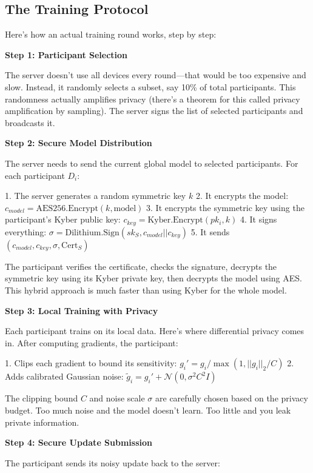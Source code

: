 \documentclass[journal]{IEEEtran}
\begin{document}
\subsection{The Training Protocol}

Here's how an actual training round works, step by step:

\textbf{Step 1: Participant Selection}

The server doesn't use all devices every round—that would be too expensive and slow. Instead, it randomly selects a subset, say 10\% of total participants. This randomness actually amplifies privacy (there's a theorem for this called privacy amplification by sampling). The server signs the list of selected participants and broadcasts it.

\textbf{Step 2: Secure Model Distribution}

The server needs to send the current global model to selected participants. For each participant $D_i$:

1. The server generates a random symmetric key $k$
2. It encrypts the model: $c_{model} = \text{AES256.Encrypt}(k, \text{model})$  
3. It encrypts the symmetric key using the participant's Kyber public key: $c_{key} = \text{Kyber.Encrypt}(pk_i, k)$
4. It signs everything: $\sigma = \text{Dilithium.Sign}(sk_S, c_{model} || c_{key})$
5. It sends $(c_{model}, c_{key}, \sigma, \text{Cert}_S)$

The participant verifies the certificate, checks the signature, decrypts the symmetric key using its Kyber private key, then decrypts the model using AES. This hybrid approach is much faster than using Kyber for the whole model.

\textbf{Step 3: Local Training with Privacy}

Each participant trains on its local data. Here's where differential privacy comes in. After computing gradients, the participant:

1. Clips each gradient to bound its sensitivity: $g_i' = g_i / \max(1, ||g_i||_2 / C)$
2. Adds calibrated Gaussian noise: $\tilde{g}_i = g_i' + \mathcal{N}(0, \sigma^2 C^2 I)$

The clipping bound $C$ and noise scale $\sigma$ are carefully chosen based on the privacy budget. Too much noise and the model doesn't learn. Too little and you leak private information.

\textbf{Step 4: Secure Update Submission}

The participant sends its noisy update back to the server:
\end{document}
